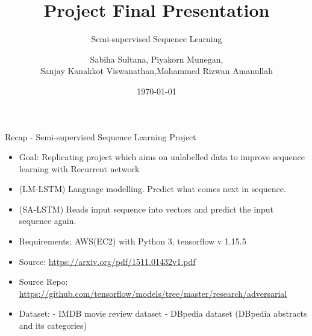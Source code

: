 \documentclass[aspectratio=169,xcolor=dvipsnames]{beamer}
\title[short title]{Project Final Presentation}
\subtitle{Semi-supervised Sequence Learning}
\author[Sanjay K V] {Sabiha Sultana\inst{1}, Piyakorn Munegan\inst{2},\\ 
Sanjay Kanakkot Viswanathan\inst{3},\break Mohammed Rizwan Amanullah\inst{4}}
\institute[NTU] %
{
    Department of Computing, \\
    Macquarie University 
    \vskip 3pt
}
\date{\today} %
\begin{document}
\begin{frame}
    \titlepage
\end{frame}

\begin{frame}{Recap - Semi-supervised Sequence Learning Project}
    \tableofcontents
\begin{itemize}
        \item Goal: Replicating project which aims on unlabelled data to improve sequence learning with Recurrent network 
        \item (LM-LSTM) Language modelling. Predict what comes next in sequence. 
        \item (SA-LSTM) Reads input sequence into vectors and predict the input sequence again. 
         \item \alert {Requirements:} AWS(EC2) with Python 3, tensorflow v 1.15.5
     \item \alert{Source:} \href{https://arxiv.org/pdf/1511.01432v1.pdf}{https://arxiv.org/pdf/1511.01432v1.pdf}
    \item \alert{Source Repo:}\href{ https://github.com/tensorflow/models/tree/master/research/adversarial_text}{ https://github.com/tensorflow/models/tree/master/research/adversarial}
    \item Dataset: \break
            - IMDB movie review dataset\break     
            - DBpedia dataset (DBpedia abstracts and its categories)
 
    \end{itemize}

\end{frame}

\end{document}
